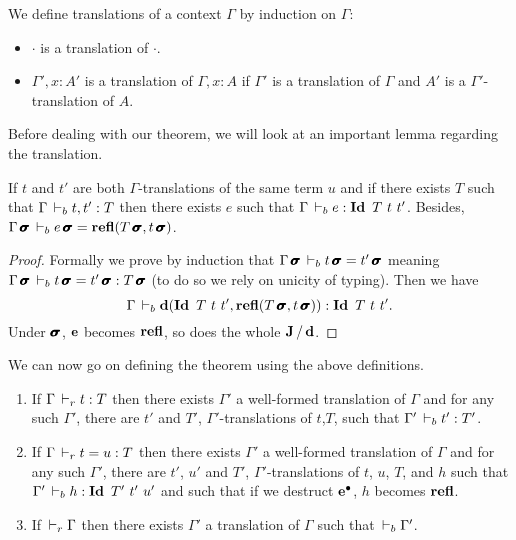 \documentclass[a4paper,english]{lipics-utf8x}
\begin{document}
  \begin{definition}
    We define translations of a context $\Gamma$ by induction on $\Gamma$:
    \begin{itemize}
      \item $\cdot$ is a translation of $\cdot$.
      \item $\Gamma', x:A'$ is a translation of $\Gamma, x:A$ if $\Gamma'$ is
            a translation of $\Gamma$ and $A'$ is a $\Gamma'$-translation of
            $A$.
    \end{itemize}
  \end{definition}
  Before dealing with our theorem, we will look at an important lemma regarding
  the translation.

  \begin{lemma}
    \label{lem:transleq}
    If $t$ and $t'$ are both $\Gamma$-translations of the same term $u$ and if
    there exists $T$ such that $\Gamma \,\vdash_b t, t' : T$ then there exists $e$
    such that $\Gamma \derb e : \Id T\ t\ t'$.
    Besides, $\Gamma \operatorname{\pmb{\bm{\sigma}}} \,\vdash_b e \operatorname{\pmb{\bm{\sigma}}} = \operatorname{\mathbf{refl}}(T\operatorname{\pmb{\bm{\sigma}}},t\operatorname{\pmb{\bm{\sigma}}})$.
  \end{lemma}

  \begin{proof}
    Formally we prove by induction that
    $\Gamma \operatorname{\pmb{\bm{\sigma}}} \,\vdash_b t \operatorname{\pmb{\bm{\sigma}}} = t' \operatorname{\pmb{\bm{\sigma}}}$
    meaning $\Gamma \operatorname{\pmb{\bm{\sigma}}} \,\vdash_b t \operatorname{\pmb{\bm{\sigma}}} = t' \operatorname{\pmb{\bm{\sigma}}} : T\operatorname{\pmb{\bm{\sigma}}}$
    (to do so we rely on unicity of typing).
    Then we have
    \[
      \Gamma \,\vdash_b \operatorname{\mathbf{d}}(\operatorname{\mathbf{Id}~} T\ t\ t', \operatorname{\mathbf{refl}}(T\operatorname{\pmb{\bm{\sigma}}}, t\operatorname{\pmb{\bm{\sigma}}})) : \operatorname{\mathbf{Id}~} T\ t\ t'.
    \]
    Under $\operatorname{\pmb{\bm{\sigma}}}$, $\operatorname{\mathbf{e}}$ becomes $\operatorname{\mathbf{refl}}$, so does the whole $\operatorname{\mathbf{J}}/\operatorname{\mathbf{d}}$.
  \end{proof}


  We can now go on defining the theorem using the above definitions.

  \begin{theorem}[Translation]
    \label{thm:transl}
    \leavevmode
    \begin{enumerate}
      \item If $\Gamma \,\vdash_r t : T$ then there exists $\Gamma'$ a well-formed
      translation of $\Gamma$ and for any such $\Gamma'$, there are $t'$ and
      $T'$, $\Gamma'$-translations of $t$,$T$,
      such that $\Gamma' \,\vdash_b t' : T'$.
      \item If $\Gamma \,\vdash_r t = u : T$ then there exists $\Gamma'$ a
      well-formed translation of $\Gamma$ and for any such $\Gamma'$, there are
      $t'$, $u'$ and $T'$, $\Gamma'$-translations of $t$, $u$, $T$, and $h$ such
      that $\Gamma' \derb h : \Id T'\ t'\ u'$ and such that if we destruct
      $\operatorname{\operatorname{\mathbf{e}}^\bullet}$, $h$ becomes $\operatorname{\mathbf{refl}}$.
      \item If $\,\vdash_r \Gamma$ then there exists $\Gamma'$ a translation of
      $\Gamma$ such that $\,\vdash_b \Gamma'$.
    \end{enumerate}
  \end{theorem}
\end{document}
